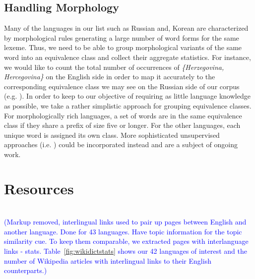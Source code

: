 \documentclass{article}
\newcommand{\todo}[1]{\textcolor{blue}{(#1)}}
\newcommand{\tabref}[1]{Table~\ref{#1}}
\begin{document}
\subsection{Handling Morphology} \label{sect:morph}

Many of the languages in our list such as Russian and, Korean are characterized by morphological rules generating a large 
number of word forms for the same lexeme.  Thus, we need to be able to group morphological variants of the same word into an equivalence class and collect their aggregate statistics.  For instance, we would like to count the total number of occurrences of \emph{\{Herzegovina, Hercegovina\}} on the English side in order to map it accurately to the corresponding equivalence class we may see on the Russian side of our corpus (e.g. ).  In order to keep to our objective of requiring as little language knowledge as possible, we take a rather simplistic approach for grouping equivalence classes.  For morphologically rich languages, a set of words are in the same equivalence class if they share a prefix of size five or longer.  For the other languages, each unique word is assigned its own class.  More sophisticated unsupervised approaches (i.e. \cite{Goldwater:2006}) could be incorporated instead and are a subject of ongoing work.

\section{Resources} \label{sect:resources}

\\

\todo{Markup removed, interlingual links used to pair up pages between English and another language.  Done for 43 languages.  Have topic information for the topic similarity cue. To keep them comparable, we extracted pages with interlanguage links - stats. \tabref{fig:wikidictstats} shows our 42 languages of interest and the number of Wikipedia articles with interlingual links to their English counterparts.} \\ 
 
\end{document}
